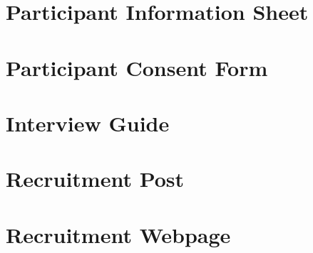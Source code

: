 \documentclass[11pt
              , a4paper
              , twoside
              , openright
              ]{report}
\begin{document}
\chapter{Participant Information Sheet}

\chapter{Participant Consent Form}

\chapter{Interview Guide}

\chapter{Recruitment Post}

\chapter{Recruitment Webpage}

\end{document}
